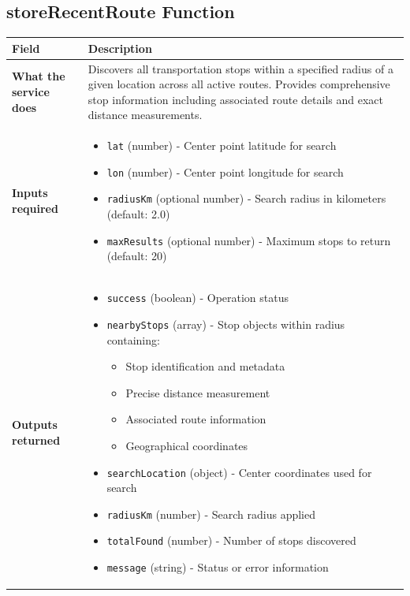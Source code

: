 \documentclass[11pt,a4paper]{article}
\begin{document}
\subsection{storeRecentRoute Function}

\begin{longtable}{|p{4cm}|p{12cm}|}
\hline
\textbf{Field} & \textbf{Description} \\
\hline
\textbf{What the service does} & 
Discovers all transportation stops within a specified radius of a given location across all active routes. Provides comprehensive stop information including associated route details and exact distance measurements. \\
\hline
\textbf{Inputs required} & 
\begin{itemize}[nosep]
\item \texttt{lat} (number) - Center point latitude for search
\item \texttt{lon} (number) - Center point longitude for search
\item \texttt{radiusKm} (optional number) - Search radius in kilometers (default: 2.0)
\item \texttt{maxResults} (optional number) - Maximum stops to return (default: 20)
\end{itemize} \\
\hline
\textbf{Outputs returned} & 
\begin{itemize}[nosep]
\item \texttt{success} (boolean) - Operation status
\item \texttt{nearbyStops} (array) - Stop objects within radius containing:
  \begin{itemize}[nosep]
  \item Stop identification and metadata
  \item Precise distance measurement
  \item Associated route information
  \item Geographical coordinates
  \end{itemize}
\item \texttt{searchLocation} (object) - Center coordinates used for search
\item \texttt{radiusKm} (number) - Search radius applied
\item \texttt{totalFound} (number) - Number of stops discovered
\item \texttt{message} (string) - Status or error information
\end{itemize} \\

\end{longtable}
\end{document}
